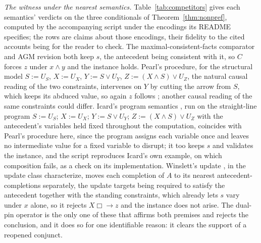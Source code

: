 \textit{The witness under the nearest semantics.} Table~\ref{tab:competitors} gives each semantics' verdicts on the three conditionals of Theorem~\ref{thm:nonpref}, computed by the accompanying script under the encodings its README specifies; the rows are claims about those encodings, their fidelity to the cited accounts being for the reader to check. The maximal-consistent-facts comparator \parencite{lewis1981} and AGM revision \parencite{agm1985} both keep $s$, the antecedent being consistent with it, so $C$ forces $z$ under $x \wedge y$ and the instance holds. Pearl's procedure, for the structural model $S := U_S$, $X := U_X$, $Y := S \vee U_Y$, $Z := (X \wedge S) \vee U_Z$, the natural causal reading of the two constraints, intervenes on $Y$ by cutting the arrow from $S$, which keeps its abduced value, so again $z$ follows \parencite{pearl2009}; another causal reading of the same constraints could differ. Icard's program semantics \parencite*{icard2017programs}, run on the straight-line program $S := U_S$; $X := U_X$; $Y := S \vee U_Y$; $Z := (X \wedge S) \vee U_Z$ with the antecedent's variables held fixed throughout the computation, coincides with Pearl's procedure here, since the program assigns each variable once and leaves no intermediate value for a fixed variable to disrupt; it too keeps $s$ and validates the instance, and the script reproduces Icard's own example, on which composition fails, as a check on its implementation. Winslett's update \parencite*{winslett1988}, in the update class \textcite{katsuno1991} characterize, moves each completion of $A$ to its nearest antecedent-completions separately, the update targets being required to satisfy the antecedent together with the standing constraints, which already lets $s$ vary under $x$ alone, so it rejects $X \mathrel{\Box\!\!\rightarrow} z$ and the instance does not arise. The dual-pin operator is the only one of these that affirms both premises and rejects the conclusion, and it does so for one identifiable reason: it clears the support of a reopened conjunct.

